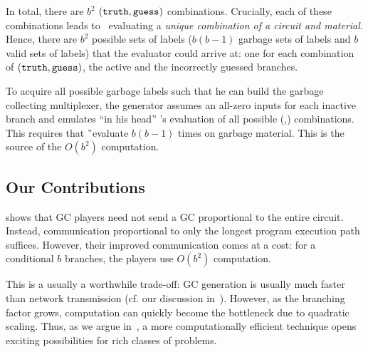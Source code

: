 In total, there are $b^2$ $(\mathtt{truth}, \mathtt{guess})$ combinations.
Crucially, each of these combinations leads to \E\ evaluating a
\emph{unique combination of a circuit and material}.
Hence, there are $b^2$ possible sets of labels ($b(b-1)$ garbage sets of labels and $b$ valid sets of labels)  that the evaluator
could arrive at: one for each combination of $(\mathtt{truth},\mathtt{guess})$, the
active and the incorrectly guessed branches.
%


To acquire all possible garbage labels such that he can build the
garbage collecting multiplexer, the \HK generator assumes an all-zero
inputs for each
inactive branch and emulates ``in his head'' \E's evaluation of all possible (\truth,\guess) combinations.
This requires that \G\ evaluate $b(b-1)$ times on garbage material.
This is the source of the $O(b^2)$ computation.






\subsection{Our Contributions}
\label{sec:ourContrib}

\HK shows that GC players need not send a GC
proportional to the entire circuit.
Instead, communication proportional to only the longest program execution
path suffices.
However, their improved communication comes at a cost:
for a conditional $b$ branches, the players
use $O(b^2)$ computation. 

This is a usually a worthwhile trade-off: GC generation is usually
much faster than network transmission (cf. our discussion in~).
However, as the branching factor grows, computation
can quickly become the bottleneck due to quadratic scaling.
%
Thus, as we argue in~,
a more computationally efficient technique
opens exciting possibilities for rich classes of problems.

